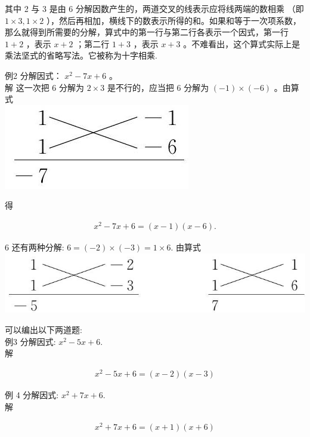 \documentclass[10pt]{article}
\begin{document}
其中 2 与 3 是由 6 分解因数产生的，两道交叉的线表示应将线两端的数相乘 （即 $1 \times 3,1 \times 2$ ），然后再相加，横线下的数表示所得的和。如果和等于一次项系数，那么就得到所需要的分解，算式中的第一行与第二行各表示一个因式，第一行 $1+2$ ，表示 $x+2$ ；第二行 $1+3$ ，表示 $x+3$ 。不难看出，这个算式实际上是乘法坚式的省略写法。它被称为十字相乘.

例2 分解因式： $x^{2}-7 x+6$ 。\\
解 这一次把 6 分解为 $2 \times 3$ 是不行的，应当把 6 分解为 $(-1) \times(-6)$ 。由算式\\
\includegraphics[max width=\textwidth, center]{2024_10_30_bd799899fef40368a068g-035(2)}

得

\begin{align*}
x^{2}-7 x+6=(x-1)(x-6) .
\end{align*}

6 还有两种分解: $6=(-2) \times(-3)=1 \times 6$. 由算式\\
\includegraphics[max width=\textwidth, center]{2024_10_30_bd799899fef40368a068g-035(1)}

可以编出以下两道题:\\
例3 分解因式: $x^{2}-5 x+6$.\\
解

\begin{align*}
x^{2}-5 x+6=(x-2)(x-3)
\end{align*}

例 4 分解因式: $x^{2}+7 x+6$.\\
解

\begin{align*}
x^{2}+7 x+6=(x+1)(x+6)
\end{align*}
\end{document}
